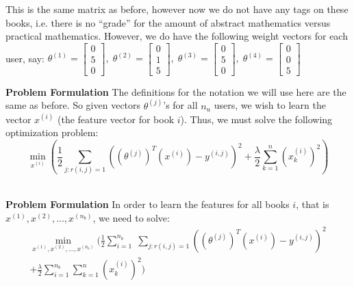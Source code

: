 \documentclass[xcolor=dvipsnames]{beamer}
\begin{document}
\begin{frame}
This is the same matrix as before, however now we do not have any tags on these books, i.e. there is no ``grade'' for the amount of abstract mathematics versus practical mathematics. \vfill\pause However, we do have the following weight vectors for each user, say:
\vfill\pause
$\theta^{(1)} = \begin{bmatrix}
0\\ 5\\ 0
\end{bmatrix}, \; \theta^{(2)} = \begin{bmatrix}
0\\ 1\\ 5
\end{bmatrix}, \; \theta^{(3)} = \begin{bmatrix}
0\\ 5\\ 0
\end{bmatrix}, \; \theta^{(4)} = \begin{bmatrix}
0\\ 0\\ 5
\end{bmatrix}$\\
\end{frame}

\begin{frame}
{\bf Problem Formulation}
The definitions for the notation we will use here are the same as before. \vfill\pause So given vectors $\theta^{(j)}$'s for all $n_u$ users, we wish to learn the vector $x^{(i)}$ (the feature vector for book $i$). \vfill\pause Thus, we must solve the following optimization problem:
\vfill\pause
\[
\boxed{\min_{x^{(i)}} \left(\frac{1}{2} \sum_{j:r(i,j)=1}((\theta^{(j)})^T(x^{(i)}) - y^{(i,j)})^2 + \frac{\lambda}{2}\sum_{k=1}^n(x^{(i)}_k)^2\right)}
\]\\
\end{frame}

\begin{frame}
{\bf Problem Formulation}
In order to learn the features for all books $i$, that is $x^{(1)}, x^{(2)}, ..., x^{(n_b)}$, we need to solve:
\vfill\pause
\begin{eqnarray*}
\min_{x^{(1)}, x^{(2)}, ..., x^{(n_b)}} \Bigg(\frac{1}{2} \sum_{i=1}^{n_b}\;\sum_{j:r(i,j)=1}((\theta^{(j)})^T(x^{(i)}) - y^{(i,j)})^2 \\ + \frac{\lambda}{2}\sum_{i=1}^{n_b}\sum_{k=1}^n(x^{(i)}_k)^2\Bigg)
\end{eqnarray*}
\end{frame}
\end{document}

